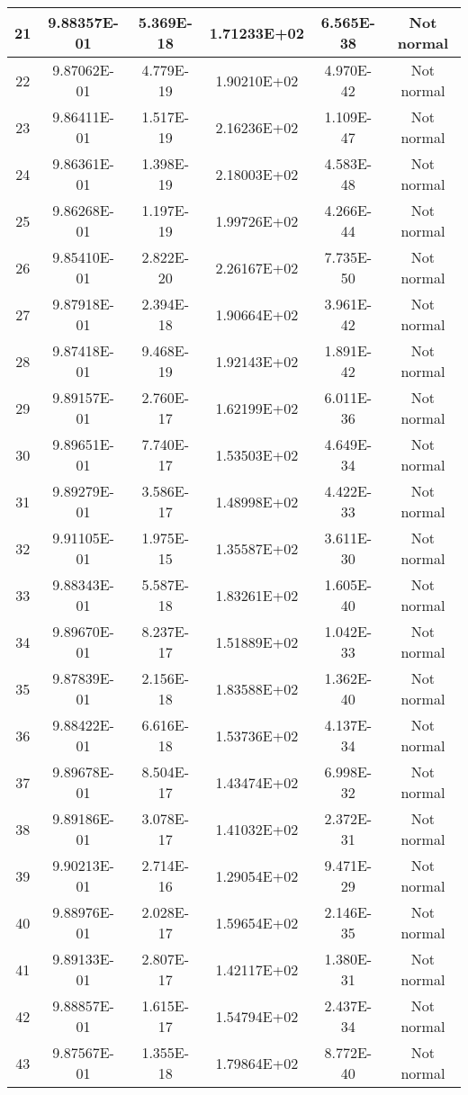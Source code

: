 \begin{table}[h]
\begin{tabular}{|c|c|c|c|c|c|}
		21 & 9.88357E-01 & 5.369E-18 & 1.71233E+02 & 6.565E-38 & Not normal\\\hline
		22 & 9.87062E-01 & 4.779E-19 & 1.90210E+02 & 4.970E-42 & Not normal\\\hline
		23 & 9.86411E-01 & 1.517E-19 & 2.16236E+02 & 1.109E-47 & Not normal\\\hline
		24 & 9.86361E-01 & 1.398E-19 & 2.18003E+02 & 4.583E-48 & Not normal\\\hline
		25 & 9.86268E-01 & 1.197E-19 & 1.99726E+02 & 4.266E-44 & Not normal\\\hline
		26 & 9.85410E-01 & 2.822E-20 & 2.26167E+02 & 7.735E-50 & Not normal\\\hline
		27 & 9.87918E-01 & 2.394E-18 & 1.90664E+02 & 3.961E-42 & Not normal\\\hline
		28 & 9.87418E-01 & 9.468E-19 & 1.92143E+02 & 1.891E-42 & Not normal\\\hline
		29 & 9.89157E-01 & 2.760E-17 & 1.62199E+02 & 6.011E-36 & Not normal\\\hline
		30 & 9.89651E-01 & 7.740E-17 & 1.53503E+02 & 4.649E-34 & Not normal\\\hline
		31 & 9.89279E-01 & 3.586E-17 & 1.48998E+02 & 4.422E-33 & Not normal\\\hline
		32 & 9.91105E-01 & 1.975E-15 & 1.35587E+02 & 3.611E-30 & Not normal\\\hline
		33 & 9.88343E-01 & 5.587E-18 & 1.83261E+02 & 1.605E-40 & Not normal\\\hline
		34 & 9.89670E-01 & 8.237E-17 & 1.51889E+02 & 1.042E-33 & Not normal\\\hline
		35 & 9.87839E-01 & 2.156E-18 & 1.83588E+02 & 1.362E-40 & Not normal\\\hline
		36 & 9.88422E-01 & 6.616E-18 & 1.53736E+02 & 4.137E-34 & Not normal\\\hline
		37 & 9.89678E-01 & 8.504E-17 & 1.43474E+02 & 6.998E-32 & Not normal\\\hline
		38 & 9.89186E-01 & 3.078E-17 & 1.41032E+02 & 2.372E-31 & Not normal\\\hline
		39 & 9.90213E-01 & 2.714E-16 & 1.29054E+02 & 9.471E-29 & Not normal\\\hline
		40 & 9.88976E-01 & 2.028E-17 & 1.59654E+02 & 2.146E-35 & Not normal\\\hline
		41 & 9.89133E-01 & 2.807E-17 & 1.42117E+02 & 1.380E-31 & Not normal\\\hline
		42 & 9.88857E-01 & 1.615E-17 & 1.54794E+02 & 2.437E-34 & Not normal\\\hline
		43 & 9.87567E-01 & 1.355E-18 & 1.79864E+02 & 8.772E-40 & Not normal\\\hline

\end{tabular}
\end{table}
